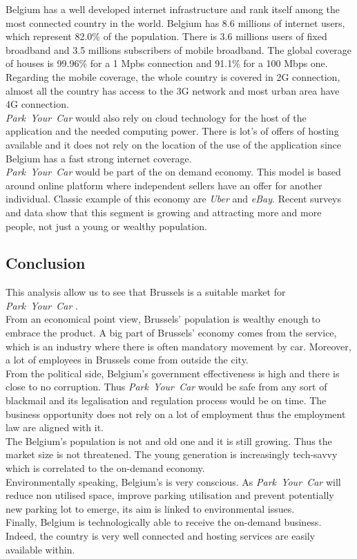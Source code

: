 \documentclass[12pt,a4paper,oneside]{book}
\newcommand{\bp}{\textit{Park~Your~Car }}
\begin{document}
Belgium has a well developed internet infrastructure and rank itself among the most connected country in the world. Belgium has 8.6 millions of internet users, which represent 82.0\% of the population.\cite{intuser} There is 3.6 millions users of fixed broadband and 3.5 millions subscribers of mobile broadband.\cite{intsub} The global coverage of houses is 99.96\% for a 1 Mpbs connection and 91.1\% for a 100 Mbps one.\cite{fixcov} Regarding the mobile coverage, the whole country is covered in 2G connection, almost all the country has access to the 3G network and most urban area have 4G connection.\cite{mobcov}\\

\bp would also rely on cloud technology for the host of the application and the needed computing power. There is lot's of offers of hosting available and it does not rely on the location of the use of the application since Belgium has a fast strong internet coverage.\\

\bp would be part of the on demand economy. This model is based around online platform where independent sellers have an offer for another individual. Classic example of this economy are \textit{Uber} and \textit{eBay}. Recent surveys and data show that this segment is growing and attracting more and more people, not just a young or wealthy population.\cite{odegrow}

\subsection{Conclusion}
This analysis allow us to see that Brussels is a suitable market for \bp.\\
From an economical point view, Brussels' population is wealthy enough to embrace the product. A big part of Brussels' economy comes from the service, which is an industry where there is often mandatory movement by car. Moreover, a lot of employees in Brussels come from outside the city.\\
From the political side, Belgium's government effectiveness is high and there is close to no corruption. Thus \bp would be safe from any sort of blackmail and its legalisation and regulation process would be on time. The business opportunity does not rely on a lot of employment thus the employment law are aligned with it.\\
The Belgium's population is not and old one and it is still growing. Thus the market size is not threatened. The young generation is increasingly tech-savvy which is correlated to the on-demand economy.\\
Environmentally speaking, Belgium's is very conscious. As \bp will reduce non utilised space, improve parking utilisation and prevent potentially new parking lot to emerge, its aim is linked to environmental issues.\\
Finally, Belgium is technologically able to receive the on-demand business. Indeed, the country is very well connected and hosting services are easily available within.
\end{document}
